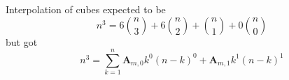 Interpolation of cubes expected to be
\[
    n^3 = 6 \binom{n}{3} + 6 \binom{n}{2} + \binom{n}{1} + 0 \binom{n}{0}
\]
but got
\[
    n^3 = \sum_{k=1}^{n} \mathbf{A}_{m,0} k^0 (n-k)^0 +  \mathbf{A}_{m,1} k^1 (n-k)^1
\]
